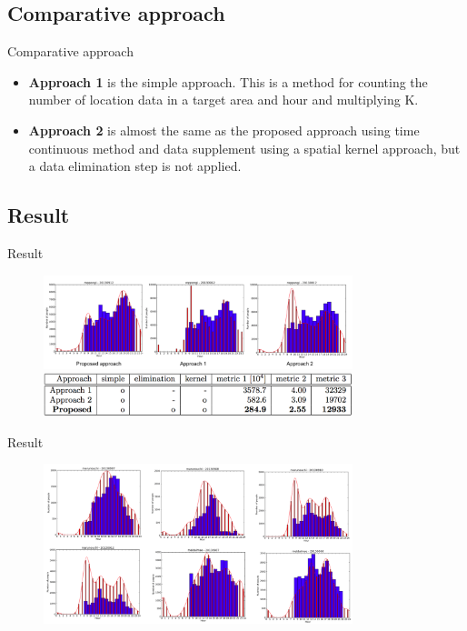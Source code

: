 \subsection{Comparative approach}\label{comparative-approach}

\begin{frame}{Comparative approach}

\begin{itemize}
\itemsep1pt\parskip0pt
\item
  \textbf{Approach 1} is the simple approach. This is a method for
  counting the number of location data in a target area and hour and
  multiplying K.
\item
  \textbf{Approach 2} is almost the same as the proposed approach using
  time continuous method and data supplement using a spatial kernel
  approach, but a data elimination step is not applied.
\end{itemize}

\end{frame}

\subsection{Result}\label{result}

\begin{frame}{Result}

\begin{figure}
\includegraphics[width = 9cm]{pic13.png}\\
\includegraphics[width = 9cm]{pic14.png}
\end{figure}

\end{frame}

\begin{frame}{Result}

\begin{figure}
\includegraphics[width = 9cm]{pic15.png}
\end{figure}

\end{frame}

